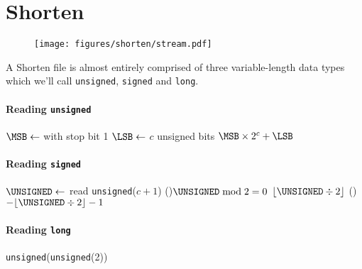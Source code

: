 \chapter{Shorten}
\begin{figure}[h]
\texttt{[image: figures/shorten/stream.pdf]}
\end{figure}
A Shorten file is almost entirely comprised of three variable-length
data types which we'll call \texttt{unsigned}, \texttt{signed} and
\texttt{long}.
\subsubsection{Reading \texttt{unsigned}}
{
  $\text{\MSB} \leftarrow$ \UNARY with stop bit 1\;
  $\text{\LSB} \leftarrow$ \READ $c$ unsigned bits\;
  \Return $\text{\MSB} \times 2 ^ c + \text{\LSB}$\;
  \EALGORITHM
}
\subsubsection{Reading \texttt{signed}}
{
  $\text{\UNSIGNED} \leftarrow$ read \texttt{unsigned}($c + 1$)\;
  \eIf(){$\UNSIGNED \bmod 2 = 0$}{
    \Return $\lfloor\UNSIGNED \div 2\rfloor$\;
  }(){
    \Return $-\lfloor\UNSIGNED \div 2\rfloor - 1$\;
  }
  \EALGORITHM
}
\subsubsection{Reading \texttt{long}}
{
  \Return \texttt{unsigned}(\texttt{unsigned}(2))\;
  \EALGORITHM
}

\clearpage

